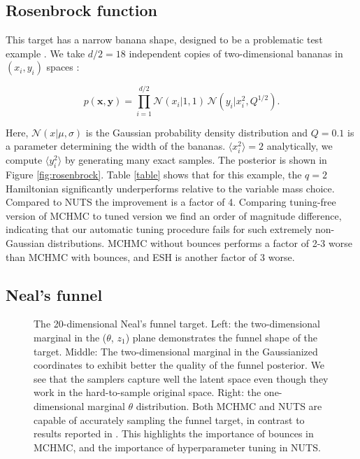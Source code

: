 \documentclass[twoside,11pt]{article}
\newcommand{\x}{\boldsymbol{x}}
\begin{document}
    
    
\subsection{Rosenbrock function}
    
    This target    has a narrow banana shape, designed to be a problematic test example \citep{rosenbrock}. We take $d/2 = 18$ independent copies of two-dimensional bananas in $(x_i, y_i)$ spaces \citep{DLMC}:
    
    \begin{equation} \nonumber
        p(\x, \boldsymbol{y}) = \prod_{i = 1}^{d/2} \mathcal{N}(x_i \vert 1, 1) \, \mathcal{N}(y_i \vert x_i^2, Q^{1/2}).
    \end{equation}
    
    Here, $\mathcal{N}(x \vert \mu, \sigma)$ is the Gaussian probability density distribution and $Q = 0.1$ is a parameter determining the width of the bananas. $\langle x_i^2 \rangle = 2$ analytically, we compute $\langle y_i^2 \rangle$ by generating many exact samples. The posterior is shown in Figure \ref{fig:rosenbrock}.
    Table \ref{table} shows that for this example, the $q = 2$ Hamiltonian significantly underperforms relative to the variable
    mass choice. Compared to NUTS  
    the improvement is a factor of 4. 
    Comparing tuning-free version of 
    MCHMC to tuned version we find an 
    order of magnitude difference, indicating 
    that our automatic tuning procedure fails 
    for such extremely non-Gaussian 
    distributions. 
    MCHMC without bounces performs a factor 
    of 2-3 worse than MCHMC with bounces, 
    and ESH is another factor of 3 worse.


\subsection{Neal's funnel}
    
    \begin{figure}
        \caption{The 20-dimensional Neal's funnel target.
        Left: the two-dimensional marginal in the ($\theta$, $z_1$) plane demonstrates the funnel shape of the target. 
        Middle: The two-dimensional marginal in the Gaussianized coordinates to exhibit better the quality of the 
        funnel posterior. We see that the samplers capture well the latent space even though they work in the hard-to-sample original space.
        Right: the one-dimensional marginal $\theta$ distribution.
        Both MCHMC and NUTS are capable of accurately sampling the funnel target, in contrast to results reported in \citet{ESH}. This
        highlights the importance of 
        bounces in MCHMC, and the importance
        of hyperparameter tuning in NUTS. 
        }
        \label{fig:funnel}
    \end{figure}
   
\end{document}
